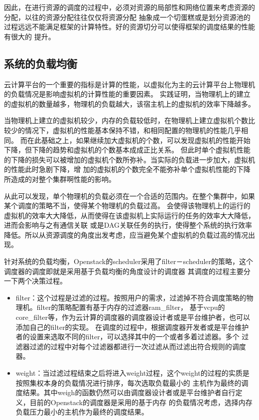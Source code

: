 因此，在进行资源的调度的过程中，必须对资源的局部性和网络位置来考虑资源的分配，以往的资源分配往往仅仅将资源分配
抽象成一个切蛋糕或是划分资源池的过程远远不能满足框架的计算特性。好的资源切分可以使得框架的调度结果的性能有很大的
提升。

\subsection{系统的负载均衡}
云计算平台的一个重要的指标是计算的性能，以虚拟化为主的云计算平台上物理机的负载情况是影响虚拟机的计算性能的重要因素。
实践证明，当物理机上的建立的虚拟机的数量越多，物理机的负载越大，该宿主机上的虚拟机的效率下降越多。

当物理机上建立的虚拟机较少，内存的负载较低时，在物理机上建立虚拟机个数比较少的情况下，虚拟机的性能基本保持不错，和相同配置的物理机的性能几乎相同。
而在此基础之上，如果继续加大虚拟机的个数，可以发现虚拟机的性能开始下降，但下降的趋势和虚拟机的个数基本成成正比关系。
但此时单个虚拟机性能的下降的损失可以被增加的虚拟机个数所弥补。当实际的负载进一步加大，虚拟机的性能此时急剧下降，增
加的虚拟机的个数完全不能弥补单个虚拟机性能的下降所造成的对整个集群啊性能的影响。

从此可以发现，单个物理机的负载必须在一个合适的范围内。在整个集群中，如果某个调度的策略不当，使得某个物理机的负载过高。
会使得该物理机上的运行的虚拟机的效率大大降低，从而使得在该虚拟机上实际运行的任务的效率大大降低，进而会影响与之有通信关联
或是DAG关联任务的执行，使得整个系统的执行效率降低。所以从资源调度的角度出发考虑，应当避免某个虚拟机的负载过高的情况出现。

针对系统的负载均衡，Openstack的scheduler采用了filter－scheduler的策略，这个调度器的调度即就是采用基于负载均衡的角度设计的调度器
其调度的过程主要分一下两个决策过程。
\begin{itemize}
\item filter：这个过程是过滤的过程。按照用户的需求，过滤掉不符合调度策略的物理机。filter的策略配置有基于内存的过滤器ram\_filter，
基于vcpu的core\_filter等，作为云计算的调度器的调度器设计者或是平台维护者，也可以添加自己的filter的实现。
在调度的过程中，根据调度器开发者或是平台维护者的设置来选取不同的filter，可以选择其中的一个或者多着过滤器。多个
过滤器过滤的过程中对每个过滤器都进行一次过滤从而过滤出符合规则的调度器。
\item weight：当过滤过程结束之后将进入weight过程，这个weight的过程的实质是按照集权本身的负载情况进行排序，每次选取负载最小的
主机作为最终的调度结果。其中weigh的函数仍然可以由调度器设计者或是平台维护者自行定义，目前的Openstack的调度器是采用的基于内存
的负载情况考虑，选择内存负载压力最小的主机作为最终的调度结果。
\end{itemize}


